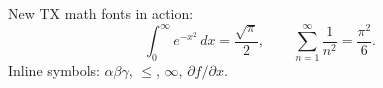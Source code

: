 \documentclass{article}
\begin{document}
New TX math fonts in action:
\[
  \int_0^\infty e^{-x^2}\,dx = \frac{\sqrt{\pi}}{2},
  \qquad \sum_{n=1}^{\infty}\frac{1}{n^2} = \frac{\pi^2}{6}.
\]
Inline symbols: $\alpha\beta\gamma$, $\leq$, $\infty$, $\partial f/\partial x$.
\end{document}
